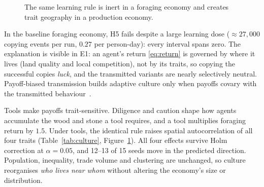 \documentclass[11pt]{article}
\theoremstyle{definition}
\newcommand{\1}{\mathbf{1}}
\begin{document}
\begin{figure}[h]
\centering
{}
\caption{The same learning rule is inert in a foraging economy and creates trait geography in a production economy.}
\label{fig:culture}
\end{figure}

In the baseline foraging economy, H5 fails despite a large learning dose ($\approx27{,}000$ copying events per run, $0.27$ per person-day): every interval spans zero. The explanation is visible in E1: an agent's return \eqref{eq:return} is governed by where it lives (land quality and local competition), not by its traits, so copying the successful copies \emph{luck}, and the transmitted variants are nearly selectively neutral. Payoff-biased transmission builds adaptive culture only when payoffs covary with the transmitted behaviour~\cite{boyd1985,henrich2004}.

Tools make payoffs trait-sensitive. Diligence and caution shape how agents accumulate the wood and stone a tool requires, and a tool multiplies foraging return by $1.5$. Under tools, the identical rule raises spatial autocorrelation of all four traits (Table~\ref{tab:culture}, Figure~\ref{fig:culture}). All four effects survive Holm correction at $\alpha=0.05$, and 12--13 of 15 seeds move in the predicted direction. Population, inequality, trade volume and clustering are unchanged, so culture reorganises \emph{who lives near whom} without altering the economy's size or distribution.
\end{document}
